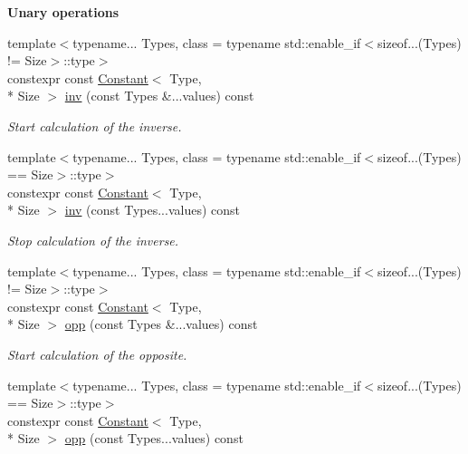 \begin{Indent}{\bf Unary operations}\par
\begin{DoxyCompactItemize}
\item 
{\footnotesize template$<$typename... Types, class  = typename std\-::enable\-\_\-if$<$sizeof...(\-Types) != Size$>$\-::type$>$ }\\constexpr const \hyperlink{exceptionmagrathea_1_1Constant}{Constant}$<$ Type, \\*
Size $>$ \hyperlink{exceptionmagrathea_1_1Constant_a669f747c750e99e4206db36b92b364ca}{inv} (const Types \&...values) const 
\begin{DoxyCompactList}\small\item\em Start calculation of the inverse. \end{DoxyCompactList}\item 
{\footnotesize template$<$typename... Types, class  = typename std\-::enable\-\_\-if$<$sizeof...(\-Types) == Size$>$\-::type$>$ }\\constexpr const \hyperlink{exceptionmagrathea_1_1Constant}{Constant}$<$ Type, \\*
Size $>$ \hyperlink{exceptionmagrathea_1_1Constant_aadc81f68d55445294f869898d1bda9d6}{inv} (const Types...\-values) const 
\begin{DoxyCompactList}\small\item\em Stop calculation of the inverse. \end{DoxyCompactList}\item 
{\footnotesize template$<$typename... Types, class  = typename std\-::enable\-\_\-if$<$sizeof...(\-Types) != Size$>$\-::type$>$ }\\constexpr const \hyperlink{exceptionmagrathea_1_1Constant}{Constant}$<$ Type, \\*
Size $>$ \hyperlink{exceptionmagrathea_1_1Constant_a8d4db0128465befe15290627c00a6f9b}{opp} (const Types \&...values) const 
\begin{DoxyCompactList}\small\item\em Start calculation of the opposite. \end{DoxyCompactList}\item 
{\footnotesize template$<$typename... Types, class  = typename std\-::enable\-\_\-if$<$sizeof...(\-Types) == Size$>$\-::type$>$ }\\constexpr const \hyperlink{exceptionmagrathea_1_1Constant}{Constant}$<$ Type, \\*
Size $>$ \hyperlink{exceptionmagrathea_1_1Constant_ae9b664f9d38125ceaf98cbd92cb8ccc5}{opp} (const Types...\-values) const 

\end{DoxyCompactItemize}
\end{Indent}
